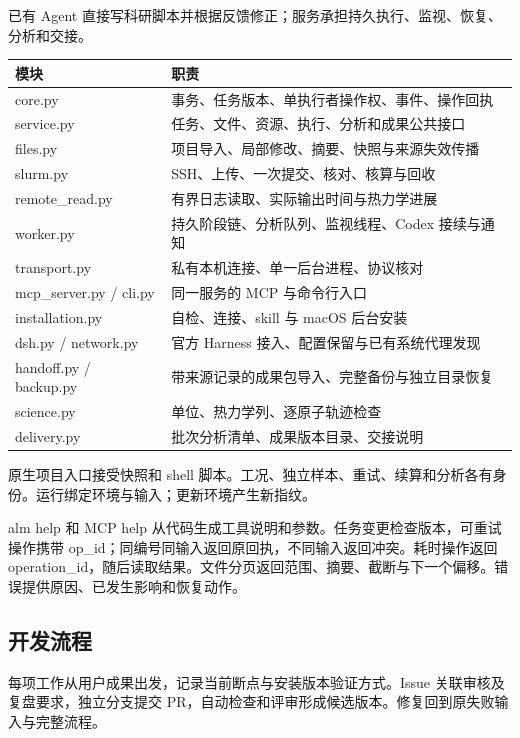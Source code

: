 \documentclass[11pt,a4paper]{ctexart}
\begin{document}
已有 Agent 直接写科研脚本并根据反馈修正；服务承担持久执行、监视、恢复、分析和交接。



\begin{longtable}{p{7.25cm}p{7.25cm}}
\toprule
模块 & 职责 \\
\midrule\endhead
core.py & 事务、任务版本、单执行者操作权、事件、操作回执 \\
service.py & 任务、文件、资源、执行、分析和成果公共接口 \\
files.py & 项目导入、局部修改、摘要、快照与来源失效传播 \\
slurm.py & SSH、上传、一次提交、核对、核算与回收 \\
remote\_\allowbreak{}read.py & 有界日志读取、实际输出时间与热力学进展 \\
worker.py & 持久阶段链、分析队列、监视线程、Codex 接续与通知 \\
transport.py & 私有本机连接、单一后台进程、协议核对 \\
mcp\_\allowbreak{}server.py /\allowbreak{} cli.py & 同一服务的 MCP 与命令行入口 \\
installation.py & 自检、连接、skill 与 macOS 后台安装 \\
dsh.py /\allowbreak{} network.py & 官方 Harness 接入、配置保留与已有系统代理发现 \\
handoff.py /\allowbreak{} backup.py & 带来源记录的成果包导入、完整备份与独立目录恢复 \\
science.py & 单位、热力学列、逐原子轨迹检查 \\
delivery.py & 批次分析清单、成果版本目录、交接说明 \\
\bottomrule
\end{longtable}


原生项目入口接受快照和 shell 脚本。工况、独立样本、重试、续算和分析各有身份。运行绑定环境与输入；更新环境产生新指纹。



alm help 和 MCP help 从代码生成工具说明和参数。任务变更检查版本，可重试操作携带 op\_\allowbreak{}id；同编号同输入返回原回执，不同输入返回冲突。耗时操作返回 operation\_\allowbreak{}id，随后读取结果。文件分页返回范围、摘要、截断与下一个偏移。错误提供原因、已发生影响和恢复动作。



\subsection{开发流程}


每项工作从用户成果出发，记录当前断点与安装版本验证方式。Issue 关联审核及复盘要求，独立分支提交 PR，自动检查和评审形成候选版本。修复回到原失败输入与完整流程。
\end{document}
